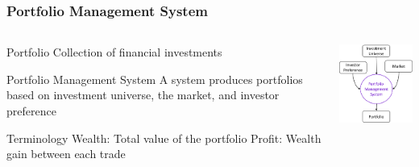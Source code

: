 \begin{frame}
\frametitle{Portfolio Management System}
\begin{columns}
\begin{column}{0.55\textwidth}
\begin{block}{Portfolio}
Collection of financial investments
\end{block}
\begin{block}{Portfolio Management System}
A system produces portfolios based on investment universe, the market, and investor preference
\end{block}
\begin{block}{Terminology}
    Wealth: Total value of the portfolio
    Profit: Wealth gain between each trade
\end{block}
\end{column}

\begin{column}{0.45\textwidth}
\begin{center}
\includegraphics[width=4.8cm]{images/portfolio_management_system.png}
\end{center}
\end{column}
\end{columns}
\end{frame}


